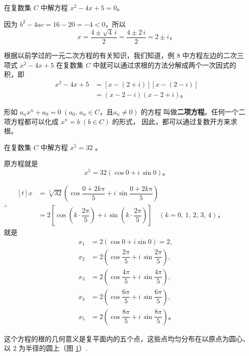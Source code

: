 \liti 在复数集 $C$ 中解方程 $x^2 - 4x + 5 = 0$。

\jie 因为 $b^2 - 4ac = 16 - 20 = -4 < 0$，所以
$$ x = \dfrac{4 \pm \sqrt{4}\,i}{2} = \dfrac{4 \pm 2\,i}{2} = 2 \pm i \text{，} $$

根据以前学过的一元二次方程的有关知识，我们知道，例 8 中方程左边的二次三项式
$x^2 - 4x + 5$ 在复数集 $C$ 中就可以通过求根的方法分解成两个一次因式的积，即
\begin{align*}
    x^2 - 4x + 5 &= [x - (2 + i)] [x - (2 - i)] \\
        &= (x - 2 - i)(x - 2 + i) \text{。}
\end{align*}

形如 $a_n x^n + a_0 = 0 \; (a_0, \, a_n \in C \text{，且} a_n \neq 0)$ 的方程
叫做\textbf{二项方程}。任何一个二项方程都可以化成 $x^n = b \; (b \in C)$ 的形式，
因此，都可以通过复数开方来求根。




\liti 在复数集 $C$ 中解方程 $x^5 = 32$ 。

\jie 原方程就是
$$ x^5 = 32(\cos 0 + i\,\sin 0) \text{。}$$

$\therefore \quad \begin{aligned}[t]
    x &= \sqrt[5]{32} \left( \cos\dfrac{0 + 2k\pi}{5} + i\,\sin\dfrac{0 + 2k\pi}{5} \right) \\
      & = 2 \left[ \cos\left( k \cdot \dfrac{2\pi}{5} \right) + i\,\sin\left( k \cdot \dfrac{2\pi}{5} \right) \right] \quad (k = 0,\, 1,\, 2,\, 3,\, 4) \text{，}
\end{aligned}$\\
就是
\begin{align*}
    x_1 &= 2 (\cos 0 + i \sin 0) = 2 , \\
    x_2 &= 2 \left( \cos\dfrac{2\pi}{5} + i\,\sin\dfrac{2\pi}{5} \right), \\
    x_3 &= 2 \left( \cos\dfrac{4\pi}{5} + i\,\sin\dfrac{4\pi}{5} \right), \\
    x_4 &= 2 \left( \cos\dfrac{6\pi}{5} + i\,\sin\dfrac{6\pi}{5} \right), \\
    x_5 &= 2 \left( \cos\dfrac{8\pi}{5} + i\,\sin\dfrac{8\pi}{5} \right) \text{。}
\end{align*}

这个方程的根的几何意义是复平面内的五个点，这些点均匀分布在以原点为圆心、以 $2$ 为半径的圆上（图 \ref{fig:5-13}）.

\begin{figure}[htbp]
    \centering
    
    \caption{}\label{fig:5-13}
\end{figure}


